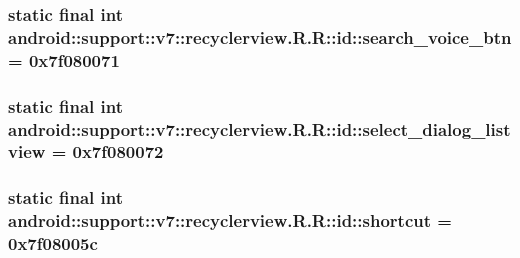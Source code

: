 \hypertarget{classandroid_1_1support_1_1v7_1_1recyclerview_1_1_r_1_1id_ee3f690c2dd481fedf72e390ae092e4c}{
\subsubsection[{search\_\-voice\_\-btn}]{\setlength{\rightskip}{0pt plus 5cm}static final int android::support::v7::recyclerview.R.R::id::search\_\-voice\_\-btn = 0x7f080071}}
\label{classandroid_1_1support_1_1v7_1_1recyclerview_1_1_r_1_1id_ee3f690c2dd481fedf72e390ae092e4c}


\hypertarget{classandroid_1_1support_1_1v7_1_1recyclerview_1_1_r_1_1id_e550b2c35b4071ed768d5ff8f10b5bb7}{
\subsubsection[{select\_\-dialog\_\-listview}]{\setlength{\rightskip}{0pt plus 5cm}static final int android::support::v7::recyclerview.R.R::id::select\_\-dialog\_\-listview = 0x7f080072}}
\label{classandroid_1_1support_1_1v7_1_1recyclerview_1_1_r_1_1id_e550b2c35b4071ed768d5ff8f10b5bb7}


\hypertarget{classandroid_1_1support_1_1v7_1_1recyclerview_1_1_r_1_1id_61888db4495d55b9941ec0fe3cced822}{
\subsubsection[{shortcut}]{\setlength{\rightskip}{0pt plus 5cm}static final int android::support::v7::recyclerview.R.R::id::shortcut = 0x7f08005c}}
\label{classandroid_1_1support_1_1v7_1_1recyclerview_1_1_r_1_1id_61888db4495d55b9941ec0fe3cced822}


